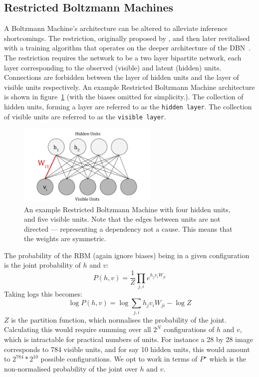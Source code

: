 \subsection{Restricted Boltzmann Machines}


A Boltzmann Machine's architecture can be altered to alleviate inference shortcomings. The restriction, originally proposed by \cite{Smolensky:1986vy}, and then later revitalised with a training algorithm that operates on the deeper architecture of the DBN~\cite{geoffreye.hintonterrencej.sejnowski1983}. The restriction requires the network to be a two layer bipartite network, each layer corresponding to the observed (visible) and latent (hidden) units. Connections are forbidden between the layer of hidden units and the layer of visible units respectively. An example Restricted Boltzmann Machine architecture is shown in figure~\ref{F:Restricted-Boltzmann-Machine} (with the biases omitted for simplicity.). The collection of hidden units, forming a layer are referred to as the \texttt{hidden layer}. The collection of visible units are referred to as the \texttt{visible layer}.

\begin{figure}[h]
\begin{center}
  \includegraphics[width = 0.6\textwidth]{Assets/RBM_Example.png}
\caption{An example Restricted Boltzmann Machine with four hidden units, and five visible units. Note that the edges between units are not directed --- representing a dependency not a cause. This means that the weights are symmetric.}
\label{F:Restricted-Boltzmann-Machine}
\end{center}
\end{figure}

The probability of the RBM (again ignore biases) being in a given configuration is the joint probability of $h$ and $v$:
$$ P(h,v) = \frac{1}{Z} \prod_{j,i} e^{h_jv_iW_{ji}} $$
Taking logs this becomes:
$$ \log P(h,v) = \log \sum_{j,i} h_jv_i  W_{ji}  - \log Z $$
$ Z $ is the partition function, which normalises the probability of the joint. Calculating this would require summing over all $2^N$ configurations of $h$ and $v$, which is intractable for practical numbers of units. For instance a 28 by 28 image corresponds to 784 visible units, and for say 10 hidden units, this would amount to $ 2^{784} * 2^{10} $ possible configurations. We opt to work in terms of $P^\star$ which is the non-normalised probability of the joint over $h \text{ and } v$.

